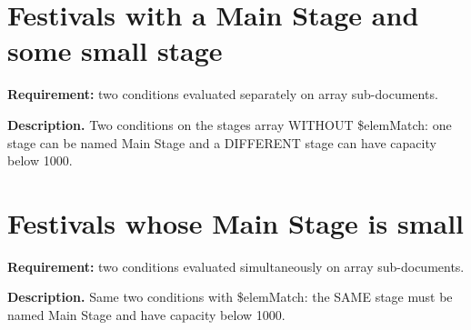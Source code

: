\section{Festivals with a Main Stage and some small stage}
\textbf{Requirement:} two conditions evaluated separately on array sub-documents.

\textbf{Description.} Two conditions on the stages array WITHOUT \$elemMatch: one stage can be named Main Stage and a DIFFERENT stage can have capacity below 1000. 



\section{Festivals whose Main Stage is small}
\textbf{Requirement:} two conditions evaluated simultaneously on array sub-documents.

\textbf{Description.} Same two conditions with \$elemMatch: the SAME stage must be named Main Stage and have capacity below 1000. 



